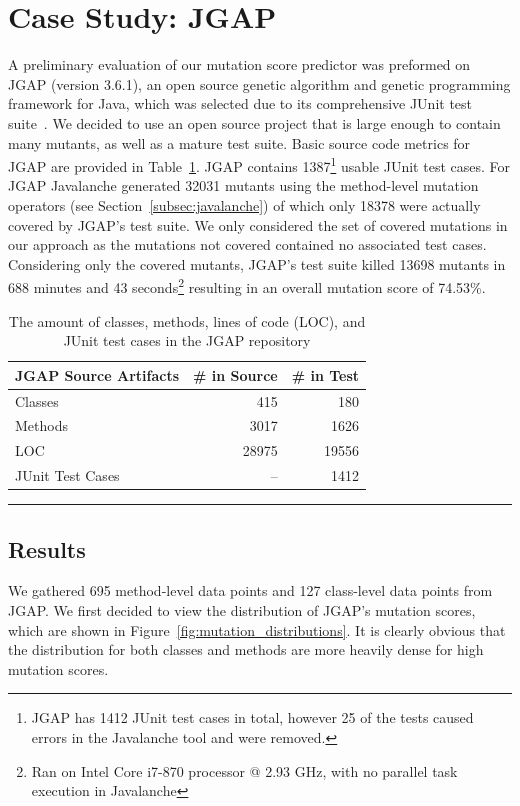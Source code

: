 \documentclass[conference]{IEEEtran}
\begin{document}
\section{Case Study: JGAP}
\label{sec:case_study}
A preliminary evaluation of our mutation score predictor was preformed on JGAP (version 3.6.1), an open source genetic algorithm and genetic programming framework for Java, which was selected due to its comprehensive JUnit test suite~\cite{JGAP}. We decided to use an open source project that is large enough to contain many mutants, as well as a mature test suite. Basic source code metrics for JGAP are provided in Table~\ref{tab:jgap_source_stats}. JGAP contains 1387\footnote{JGAP has 1412 JUnit test cases in total, however 25 of the tests caused errors in the Javalanche tool and were removed.} usable JUnit test cases. For JGAP Javalanche generated 32031 mutants using the method-level mutation operators (see Section~\ref{subsec:javalanche}) of which only 18378 were actually covered by JGAP's test suite. We only considered the set of covered mutations in our approach as the mutations not covered contained no associated test cases. Considering only the covered mutants, JGAP's test suite killed 13698 mutants in 688 minutes and 43 seconds\footnote{Ran on Intel Core i7-870 processor @ 2.93 GHz, with no parallel task execution in Javalanche} resulting in an overall mutation score of 74.53\%.

\begin{table}[!t]
  \centering
  \begin{tabular}{|l|r|r|}
    \hline
    \rowcolor[RGB]{169,196,223}
    \textbf{JGAP Source Artifacts} & \textbf{\# in Source} & \textbf{\# in Test} \\
    \hline Classes & 415 & 180 \\
    \hline Methods & 3017 & 1626 \\
    \hline LOC & 28975 & 19556 \\
    \hline JUnit Test Cases & -- & 1412\footnotemark[1] \\
    \hline
  \end{tabular}
  \caption{The amount of classes, methods, lines of code (LOC), and JUnit test cases in the JGAP repository}
  \label{tab:jgap_source_stats}
  \vspace{2mm}
  \hrule
\end{table}


\subsection{Results}
\label{subsec:results}
We gathered 695 method-level data points and 127 class-level data points from JGAP. We first decided to view the distribution of JGAP's mutation scores, which are shown in Figure~\ref{fig:mutation_distributions}. It is clearly obvious that the distribution for both classes and methods are more heavily dense for high mutation scores.
\end{document}
